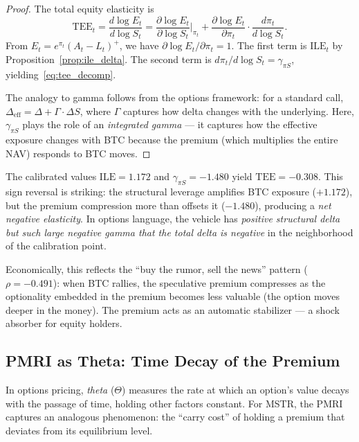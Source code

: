 \begin{proof}
The total equity elasticity is
\[
  \mathrm{TEE}_t = \frac{d\log E_t}{d\log S_t} = \frac{\partial \log E_t}{\partial \log S_t}\bigg|_{\pi_t} + \frac{\partial \log E_t}{\partial \pi_t} \cdot \frac{d\pi_t}{d\log S_t}.
\]
From $E_t = e^{\pi_t}(A_t - L_t)^+$, we have $\partial \log E_t / \partial \pi_t = 1$. The first term is $\mathrm{ILE}_t$ by Proposition~\ref{prop:ile_delta}. The second term is $d\pi_t / d\log S_t = \gamma_{\pi S}$, yielding~\eqref{eq:tee_decomp}.

The analogy to gamma follows from the options framework: for a standard call, $\Delta_{\text{eff}} = \Delta + \Gamma \cdot \Delta S$, where $\Gamma$ captures how delta changes with the underlying. Here, $\gamma_{\pi S}$ plays the role of an \emph{integrated gamma} --- it captures how the effective exposure changes with BTC because the premium (which multiplies the entire NAV) responds to BTC moves.
\end{proof}

\begin{remark}
\label{rem:tee_calibrated}
The calibrated values $\mathrm{ILE} = 1.172$ and $\gamma_{\pi S} = -1.480$ yield $\mathrm{TEE} = -0.308$. This sign reversal is striking: the structural leverage amplifies BTC exposure ($+1.172$), but the premium compression more than offsets it ($-1.480$), producing a \emph{net negative elasticity}. In options language, the vehicle has \emph{positive structural delta but such large negative gamma that the total delta is negative} in the neighborhood of the calibration point.

Economically, this reflects the ``buy the rumor, sell the news'' pattern ($\rho = -0.491$): when BTC rallies, the speculative premium compresses as the optionality embedded in the premium becomes less valuable (the option moves deeper in the money). The premium acts as an automatic stabilizer --- a shock absorber for equity holders.
\end{remark}

\subsection{PMRI as Theta: Time Decay of the Premium}
\label{subsec:pmri_theta}

In options pricing, \emph{theta} ($\Theta$) measures the rate at which an option's value decays with the passage of time, holding other factors constant. For MSTR, the PMRI captures an analogous phenomenon: the ``carry cost'' of holding a premium that deviates from its equilibrium level.

